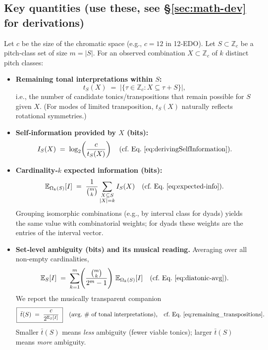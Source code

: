 \documentclass[10pt,twocolumn]{article}
\numberwithin{equation}{section} %
\begin{document}
    \subsection*{Key quantities (use these, see \S\ref{sec:math-dev} for derivations)}
    Let $c$ be the size of the chromatic space (e.g., $c{=}12$ in 12‑EDO). Let $S\subset \mathbb{Z}_c$ be a pitch‑class set of size $m{=}|S|$. For an observed combination $X\subset \mathbb{Z}_c$ of $k$ distinct pitch classes:
    \begin{itemize}
        \item \textbf{Remaining tonal interpretations within $S$:}
        \[
            t_S(X) \;=\; \bigl|\{\tau\in \mathbb{Z}_c : X \subseteq \tau{+}S\}\bigr|,
        \]
        i.e., the number of candidate tonics/transpositions that remain possible for $S$ given $X$. (For modes of limited transposition, $t_S(X)$ naturally reflects rotational symmetries.)
        \item \textbf{Self‑information provided by $X$ (bits):}
        \[
            I_S(X) \;=\; \log_2\!\left(\frac{c}{t_S(X)}\right)
            \quad\text{(cf.\ Eq.~\ref{eq:derivingSelfInformation}).}
        \]
        \item \textbf{Cardinality‑$k$ expected information (bits):}
        \[
            \mathbb{E}_{\Omega_k(S)}[I]
            \;=\; \frac{1}{\binom{m}{k}} \sum_{\substack{X\subseteq S\\ |X|=k}} I_S(X)
            \quad\text{(cf.\ Eq.~\ref{eq:expected-info}).}
        \]
        Grouping isomorphic combinations (e.g., by interval class for dyads) yields the same value with combinatorial weights; for dyads these weights are the entries of the interval vector.
        \item \textbf{Set‑level ambiguity (bits) and its musical reading.}
        Averaging over all non‑empty cardinalities,
        \[
            \mathbb{E}_S[I]
            \;=\; \sum_{k=1}^{m}\!\left(\frac{\binom{m}{k}}{2^m-1}\right)\, \mathbb{E}_{\Omega_k(S)}[I]
            \quad\text{(cf.\ Eq.~\ref{eq:diatonic-avg}).}
        \]
        We report the musically transparent companion
        \[
            \boxed{\; \bar{t}(S) \;=\; \frac{c}{2^{\mathbb{E}_S[I]}} \;}
            \quad\text{(avg.\ \# of tonal interpretations),}
            \quad\text{cf.\ Eq.~\ref{eq:remaining_transpositions}.}
        \]
        Smaller $\bar{t}(S)$ means \emph{less} ambiguity (fewer viable tonics); larger $\bar{t}(S)$ means \emph{more} ambiguity.
    \end{itemize}
\end{document}
